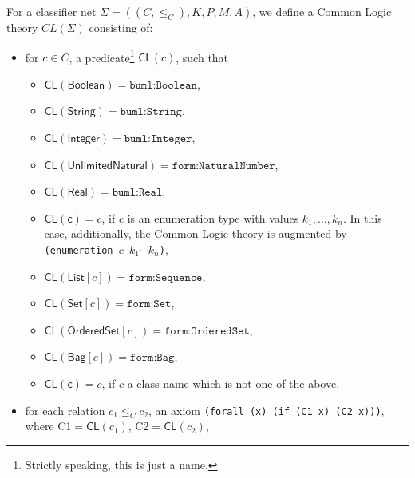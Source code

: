 \documentclass[10pt,fleqn,%
\ifpretendfinal
final%
\else
draft%
\fi,
]{scrreprt}
\newcommand*{\CL}{\ensuremath{\mathsf{CL}}\xspace}
\begin{document}
For a classifier net
$\Sigma = ((C, {\leq_C}), K, P, M, A)$, we define a Common Logic theory
$CL(\Sigma)$ consisting of:
%
\begin{itemize} %
\item for $c \in C$, a predicate\footnote{Strictly speaking, this is just a name.} $\CL(c)$,  such that 
\begin{itemize} %
\item 
  $\CL(\mathsf{Boolean}) = \texttt{buml:Boolean}$, 
\item 
  $\CL(\mathsf{String}) = \texttt{buml:String}$,
\item 
  $\CL(\mathsf{Integer}) = \texttt{buml:Integer}$,
\item 
  $\CL(\mathsf{UnlimitedNatural}) = \texttt{form:NaturalNumber}$,
\item 
  $\CL(\mathsf{Real}) = \texttt{buml:Real}$,
\item 
  $\CL(\mathsf{c}) = c$, if $c$ is an enumeration type with values $k_1,\ldots,k_n$. In this case, additionally, the Common Logic theory is augmented by
\texttt{(enumeration $c$ $k_1 \cdots k_n$)},
\item 
  $\CL(\mathsf{List}[c]) = \texttt{form:Sequence}$,
\item 
  $\CL(\mathsf{Set}[c]) = \texttt{form:Set}$,
\item 
  $\CL(\mathsf{OrderedSet}[c]) = \texttt{form:OrderedSet}$,
\item 
  $\CL(\mathsf{Bag}[c]) = \texttt{form:Bag}$,
\item 
  $\CL(\mathsf{c}) = c$, if $c$ a class name which is not one of the above. 
\end{itemize}
\item for each relation $c_1
  \leq_C c_2$, an axiom \texttt{(forall (x) (if (C1 x) (C2 x)))},
  where C1$=\CL(c_1)$, C2$=\CL(c_2)$, 


\end{itemize}
\end{document}
